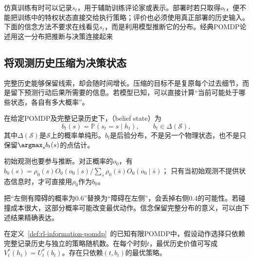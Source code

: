 仿真训练有时可以记录$s_t$，用于辅助训练评论家或表示。部署时若只取得$o_t$，便不能把训练中的特权状态直接交给执行策略；评价也必须使用真正部署的历史输入。下面的信念方法不要求在线看见$s_t$，而是利用模型推断它的分布。经典POMDP论述用这一分布把推断与决策连接起来

\subsection{将观测历史压缩为决策状态}
\label{sec:rl-information-sufficiency}

完整历史能够保留线索，却会随时间增长。压缩的目标不是复原每个过去细节，而是留下预测行动后果所需要的信息。若模型已知，可以直接计算“当前可能处于哪些状态，各自有多大概率”。

\begin{definition}[信念状态]
  \label{def:rl-information-belief}
  在给定POMDP及完整记录历史下，（belief state）为
  \[
    b_t(s)=\mathbb P(s_t=s\mid h_t),\qquad
    b_t\in\Delta(\mathcal S),
  \]
  其中$\Delta(\mathcal S)$是$\mathcal S$上的概率单纯形。$b_t$是后验分布，不是另一个物理状态，也不是只保留$\argmax_s b_t(s)$的点估计。
\end{definition}

初始观测也要参与推断。对正概率的$o_0$，有
$b_0(s)=\rho_0(s)O_0(o_0\mid s)/\sum_{\bar s}\rho_0(\bar s)O_0(o_0\mid\bar s)$；
只有当初始观测不提供状态信息时，才可直接用$\rho_0$作为$b_0$。

把“左侧有障碍的概率为0.6”替换为“障碍在左侧”，会丢掉右侧0.4的可能性。若碰撞成本很大，这部分概率可能改变最优动作。信念保留完整分布的意义，可以由下述结果精确表达。

\begin{theorem}[精确信念对最优控制充分]
  \label{thm:rl-information-belief-sufficient}
  在定义~\ref{def:rl-information-pomdp}~的已知有限POMDP中，假设动作选择只依赖完整记录历史与独立的策略随机数。在每个时刻$t$，最优历史价值可写成$V_t^*(h_t)=U_t^*(b_t)$。存在只依赖$(t,b_t)$的最优策略。
\end{theorem}

